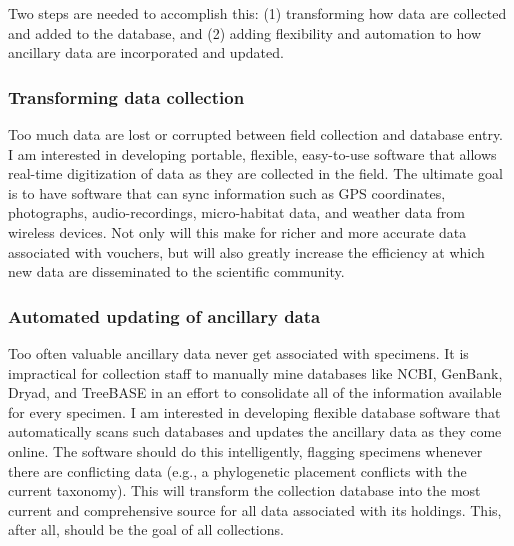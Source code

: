 Two steps are needed to accomplish this: (1) transforming how data are
collected and added to the database, and (2) adding flexibility and automation
to how ancillary data are incorporated and updated.

\subsubsection*{Transforming data collection}
Too much data are lost or corrupted between field collection and database entry.
I am interested in developing portable, flexible, easy-to-use software that
allows real-time digitization of data as they are collected in the field.
The ultimate goal is to have software that can sync information such as
GPS coordinates, photographs, audio-recordings, micro-habitat data, and
weather data from wireless devices.
Not only will this make for richer and more accurate data associated with
vouchers, but will also greatly increase the efficiency at which new
data are disseminated to the scientific community.

\subsubsection*{Automated updating of ancillary data}
Too often valuable ancillary data never get associated with specimens.
It is impractical for collection staff to manually mine databases like NCBI,
GenBank, Dryad, and TreeBASE in an effort to consolidate all of the information
available for every specimen.
I am interested in developing flexible database software that automatically
scans such databases and updates the ancillary data as they come online.
The software should do this intelligently, flagging specimens whenever there
are conflicting data (e.g., a phylogenetic placement conflicts with the current
taxonomy).
This will transform the collection database into the most current and
comprehensive source for all data associated with its holdings.
This, after all, should be the goal of all collections.


